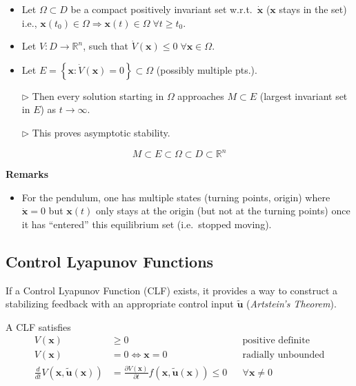 \newpar{}
\begin{itemize}[leftmargin=14pt]
    \item Let $\Omega\subset D$ be a compact positively invariant set w.r.t.\ $\dot{\mathbf{x}}$ ($\mathbf{x}$ stays in the set) i.e., $\mathbf{x}(t_0)\in \Omega \Rightarrow \mathbf{x}(t)\in\Omega\; \forall t \geq t_0$.
    \item Let $V:D\to \mathbb{R}^n$, such that $\dot{V}(\mathbf{x})\leq 0\; \forall \mathbf{x}\in \Omega$.
    \item Let $E=\left\{\mathbf{x}: \dot{V}(\mathbf{x})=0\right\}\subset \Omega$ (possibly multiple pts.).
    \item[$\rhd$] Then every solution starting in $\Omega$ approaches $M\subset E$ (largest invariant set in $E$) as $t\to \infty$. 
    \item[$\rhd$] This proves asymptotic stability.
\end{itemize}
\newpar{}
\begin{equation*}
  M\subset E \subset \Omega \subset D \subset \mathbb{R}^n  
\end{equation*}

\newpar{}
\textbf{Remarks}
\begin{itemize}\item For the pendulum, one has multiple states (turning points, origin) where $\dot{\mathbf{x}}=0$ but $\mathbf{x}(t)$ only stays at the origin (but not at the turning points) once it has ``entered'' this equilibrium set (i.e.\ stopped moving).
\end{itemize}

\subsection{Control Lyapunov Functions}
If a Control Lyapunov Function (CLF) exists, it provides a way to construct a stabilizing feedback with an appropriate control input $\tilde{\mathbf{u}}$ (\textit{Artstein's Theorem}).

\newpar{}
A CLF satisfies
\noindent\begin{align*}
    V(\mathbf{x})                                              & \geq 0                                                                                           &  & \text{positive definite}  \\
    V(\mathbf{x})                                              & = 0 \Leftrightarrow \mathbf{x} = 0                                                               &  & \text{radially unbounded} \\
    \frac{d}{dt} V(\mathbf{x}, \tilde{\mathbf{u}}(\mathbf{x})) & = \frac{\partial V(\mathbf{x})}{\partial t} f(\mathbf{x}, \tilde{\mathbf{u}}(\mathbf{x})) \leq 0 &  & \forall \mathbf{x}\neq 0
\end{align*}

